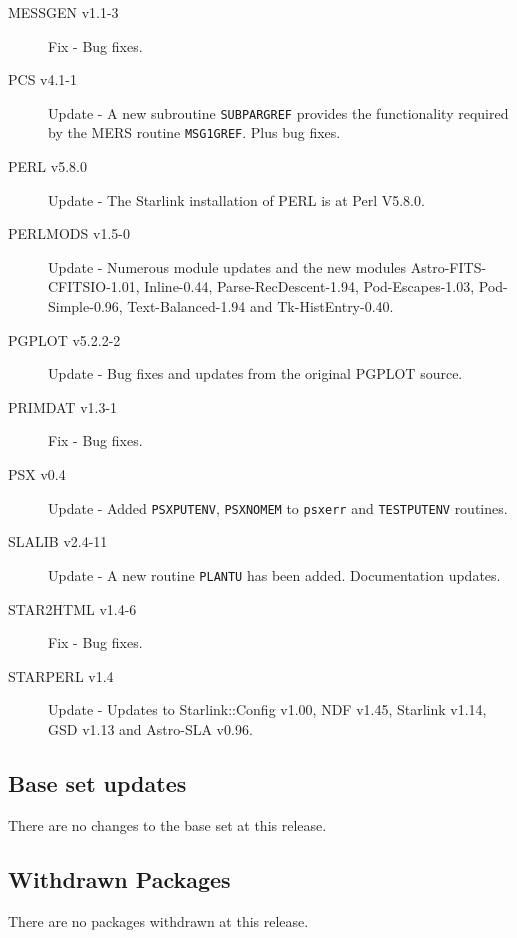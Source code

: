 \documentclass[twoside,11pt]{article}
\newcommand{\xlabel}[1]{}
\renewcommand{\_}{\texttt{\symbol{95}}}
\begin{document}
\begin{description}
\item[MESSGEN v1.1-3] Fix - Bug fixes.

\item[PCS v4.1-1] Update - A new subroutine \texttt{SUBPAR\_GREF} provides the functionality
required by the MERS routine \texttt{MSG1\_GREF}. Plus bug fixes.

\item[PERL v5.8.0] Update - The Starlink installation of PERL is at Perl V5.8.0.

\item[PERLMODS v1.5-0] Update - Numerous module updates and the new modules
Astro-FITS-CFITSIO-1.01, Inline-0.44, Parse-RecDescent-1.94, Pod-Escapes-1.03,
Pod-Simple-0.96, Text-Balanced-1.94 and Tk-HistEntry-0.40.

\item[PGPLOT v5.2.2-2] Update - Bug fixes and updates from the original PGPLOT source.

\item[PRIMDAT v1.3-1] Fix - Bug fixes.

\item[PSX v0.4] Update - Added \texttt{PSX\_PUTENV}, \texttt{PSX\_\_NOMEM} to \texttt{psx\_err} and
\texttt{TEST\_PUTENV} routines.

\item[SLALIB v2.4-11] Update - A new routine \texttt{PLANTU} has been added.
Documentation updates.

\item[STAR2HTML v1.4-6] Fix - Bug fixes.

\item[STARPERL v1.4] Update - Updates to Starlink::Config v1.00, NDF v1.45,
Starlink v1.14, GSD v1.13 and Astro-SLA v0.96.
\end{description}

\subsection{\xlabel{base_set_updates}Base set updates}
\label{base_set_updates}

There are no changes to the base set at this release.

\subsection{\xlabel{withdrawn_packages}Withdrawn Packages}
\label{withdrawn_packages}

There are no packages withdrawn at this release.
\end{document}
